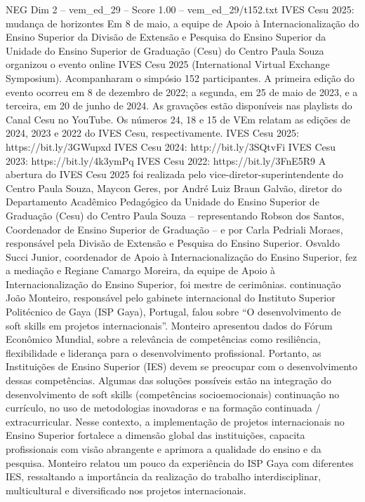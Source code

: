 \begin{textsample}{NEG Dim 2 – vem\_ed\_29 – Score 1.00 – vem\_ed\_29/t152.txt}  \label{ex:f2_neg_060}
IVES Cesu 2025: mudança de horizontes Em 8 de maio, a equipe de Apoio à Internacionalização do Ensino Superior da Divisão de Extensão e Pesquisa do Ensino Superior da Unidade do Ensino Superior de Graduação (Cesu) do Centro Paula Souza organizou o evento online IVES Cesu 2025 (International Virtual Exchange Symposium).
Acompanharam o simpósio 152 participantes.
A primeira edição do evento ocorreu em 8 de dezembro de 2022; a segunda, em 25 de maio de 2023, e a terceira, em 20 de junho de 2024.
As gravações estão disponíveis nas playlists do Canal Cesu no YouTube.
Os números 24, 18 e 15 de VEm relatam as edições de 2024, 2023 e 2022 do IVES Cesu, respectivamente.
IVES Cesu 2025: https://bit.ly/3GWupxd IVES Cesu 2024: http://bit.ly/3SQtvFi IVES Cesu 2023: https://bit.ly/4k3ymPq IVES Cesu 2022: https://bit.ly/3FnE5R9 A abertura do IVES Cesu 2025 foi realizada pelo vice-diretor-superintendente do Centro Paula Souza, Maycon Geres, por André Luiz Braun Galvão, diretor do Departamento Acadêmico Pedagógico da Unidade do Ensino Superior de Graduação (Cesu) do Centro Paula Souza – representando Robson dos Santos, Coordenador de Ensino Superior de Graduação – e por Carla Pedriali Moraes, responsável pela Divisão de Extensão e Pesquisa do Ensino Superior.
Osvaldo Succi Junior, coordenador de Apoio à Internacionalização do Ensino Superior, fez a mediação e Regiane Camargo Moreira, da equipe de Apoio à Internacionalização do Ensino Superior, foi mestre de cerimônias. continuação João Monteiro, responsável pelo gabinete internacional do Instituto Superior Politécnico de Gaya (ISP Gaya), Portugal, falou sobre “O desenvolvimento de soft skills em projetos internacionais”.
Monteiro apresentou dados do Fórum Econômico Mundial, sobre a relevância de competências como resiliência, flexibilidade e liderança para o desenvolvimento profissional.
Portanto, as Instituições de Ensino Superior (IES) devem se preocupar com o desenvolvimento dessas competências.
Algumas das soluções possíveis estão na integração do desenvolvimento de soft skills (competências socioemocionais) continuação no currículo, no uso de metodologias inovadoras e na formação continuada / extracurricular.
Nesse contexto, a implementação de projetos internacionais no Ensino Superior fortalece a dimensão global das instituições, capacita profissionais com visão abrangente e aprimora a qualidade do ensino e da pesquisa.
Monteiro relatou um pouco da experiência do ISP Gaya com diferentes IES, ressaltando a importância da realização do trabalho interdisciplinar, multicultural e diversificado nos projetos internacionais.

\end{textsample}
